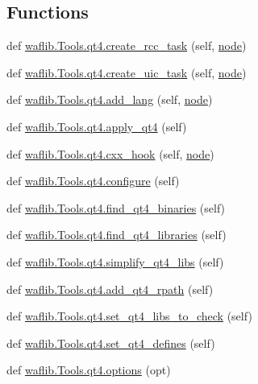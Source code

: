\subsection*{Functions}
\begin{DoxyCompactItemize}
\item 
def \hyperlink{namespacewaflib_1_1_tools_1_1qt4_a474b0d2fbfa3f41d0be506bd012b75fb}{waflib.\+Tools.\+qt4.\+create\+\_\+rcc\+\_\+task} (self, \hyperlink{structnode}{node})
\item 
def \hyperlink{namespacewaflib_1_1_tools_1_1qt4_ad4a5580d4638234e662477361f0fda9b}{waflib.\+Tools.\+qt4.\+create\+\_\+uic\+\_\+task} (self, \hyperlink{structnode}{node})
\item 
def \hyperlink{namespacewaflib_1_1_tools_1_1qt4_a5b0b5d1bfcb4a4029118af0264dfa58e}{waflib.\+Tools.\+qt4.\+add\+\_\+lang} (self, \hyperlink{structnode}{node})
\item 
def \hyperlink{namespacewaflib_1_1_tools_1_1qt4_ade7298e4ce0fa4005d38b089e4cc24e8}{waflib.\+Tools.\+qt4.\+apply\+\_\+qt4} (self)
\item 
def \hyperlink{namespacewaflib_1_1_tools_1_1qt4_a9e77ad1c524ba2462aae1027b92d847e}{waflib.\+Tools.\+qt4.\+cxx\+\_\+hook} (self, \hyperlink{structnode}{node})
\item 
def \hyperlink{namespacewaflib_1_1_tools_1_1qt4_ab06091d89d2419c0bdcc1a8b4e8a5708}{waflib.\+Tools.\+qt4.\+configure} (self)
\item 
def \hyperlink{namespacewaflib_1_1_tools_1_1qt4_a9d713f54dfc0b93695e51d28b677c38c}{waflib.\+Tools.\+qt4.\+find\+\_\+qt4\+\_\+binaries} (self)
\item 
def \hyperlink{namespacewaflib_1_1_tools_1_1qt4_aaf43095cd0a568379de0c83453ffb82c}{waflib.\+Tools.\+qt4.\+find\+\_\+qt4\+\_\+libraries} (self)
\item 
def \hyperlink{namespacewaflib_1_1_tools_1_1qt4_a1ca1a6f71a509166d314de0b090fd631}{waflib.\+Tools.\+qt4.\+simplify\+\_\+qt4\+\_\+libs} (self)
\item 
def \hyperlink{namespacewaflib_1_1_tools_1_1qt4_ac51854ca134dd7809a306fa60e1e3011}{waflib.\+Tools.\+qt4.\+add\+\_\+qt4\+\_\+rpath} (self)
\item 
def \hyperlink{namespacewaflib_1_1_tools_1_1qt4_ac7cb8f87b4c5e024cf1f935043896c86}{waflib.\+Tools.\+qt4.\+set\+\_\+qt4\+\_\+libs\+\_\+to\+\_\+check} (self)
\item 
def \hyperlink{namespacewaflib_1_1_tools_1_1qt4_a6e8e47988cb2379f9a8c1eafb7d1adfb}{waflib.\+Tools.\+qt4.\+set\+\_\+qt4\+\_\+defines} (self)
\item 
def \hyperlink{namespacewaflib_1_1_tools_1_1qt4_afee9bc1a5bd6ad0a2b0ed1d645c477b1}{waflib.\+Tools.\+qt4.\+options} (opt)
\end{DoxyCompactItemize}
